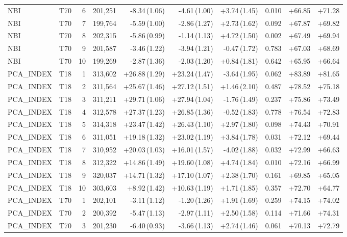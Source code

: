 \begin{table}[ht]
{\begin{tabular}{llrrrrrrrr}
NBI & T70 & 6 & 201,251 & -8.34\,(1.06) & -4.61\,(1.00) & +3.74\,(1.45) & 0.010 & +66.85 & +71.28 \\
NBI & T70 & 7 & 199,764 & -5.59\,(1.00) & -2.86\,(1.27) & +2.73\,(1.62) & 0.092 & +67.87 & +69.82 \\
NBI & T70 & 8 & 202,315 & -5.86\,(0.99) & -1.14\,(1.13) & +4.72\,(1.50) & 0.002 & +67.49 & +69.94 \\
NBI & T70 & 9 & 201,587 & -3.46\,(1.22) & -3.94\,(1.21) & -0.47\,(1.72) & 0.783 & +67.03 & +68.69 \\
NBI & T70 & 10 & 199,269 & -2.87\,(1.36) & -2.03\,(1.20) & +0.84\,(1.81) & 0.642 & +65.95 & +66.64 \\
PCA_INDEX & T18 & 1 & 313,602 & +26.88\,(1.29) & +23.24\,(1.47) & -3.64\,(1.95) & 0.062 & +83.89 & +81.65 \\
PCA_INDEX & T18 & 2 & 311,564 & +25.67\,(1.46) & +27.12\,(1.51) & +1.46\,(2.10) & 0.487 & +78.52 & +75.18 \\
PCA_INDEX & T18 & 3 & 311,211 & +29.71\,(1.06) & +27.94\,(1.04) & -1.76\,(1.49) & 0.237 & +75.86 & +73.49 \\
PCA_INDEX & T18 & 4 & 312,578 & +27.37\,(1.23) & +26.85\,(1.36) & -0.52\,(1.83) & 0.778 & +76.54 & +72.83 \\
PCA_INDEX & T18 & 5 & 314,318 & +23.47\,(1.42) & +26.43\,(1.10) & +2.97\,(1.80) & 0.098 & +74.43 & +70.91 \\
PCA_INDEX & T18 & 6 & 311,051 & +19.18\,(1.32) & +23.02\,(1.19) & +3.84\,(1.78) & 0.031 & +72.12 & +69.44 \\
PCA_INDEX & T18 & 7 & 310,952 & +20.03\,(1.03) & +16.01\,(1.57) & -4.02\,(1.88) & 0.032 & +72.99 & +66.63 \\
PCA_INDEX & T18 & 8 & 312,322 & +14.86\,(1.49) & +19.60\,(1.08) & +4.74\,(1.84) & 0.010 & +72.16 & +66.99 \\
PCA_INDEX & T18 & 9 & 320,037 & +14.71\,(1.32) & +17.10\,(1.07) & +2.38\,(1.70) & 0.161 & +69.85 & +65.05 \\
PCA_INDEX & T18 & 10 & 303,603 & +8.92\,(1.42) & +10.63\,(1.19) & +1.71\,(1.85) & 0.357 & +72.70 & +64.77 \\
PCA_INDEX & T70 & 1 & 202,101 & -3.11\,(1.12) & -1.20\,(1.26) & +1.91\,(1.69) & 0.259 & +74.15 & +74.02 \\
PCA_INDEX & T70 & 2 & 200,392 & -5.47\,(1.13) & -2.97\,(1.11) & +2.50\,(1.58) & 0.114 & +71.66 & +74.31 \\
PCA_INDEX & T70 & 3 & 201,230 & -6.40\,(0.93) & -3.66\,(1.13) & +2.74\,(1.46) & 0.061 & +70.13 & +72.79 \\

\end{tabular}}
\end{table}
